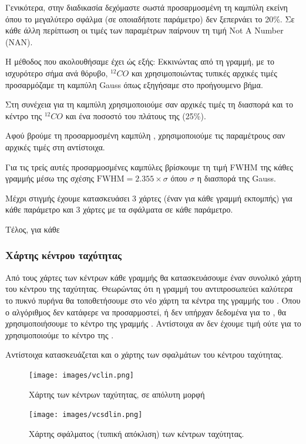 \documentclass[a4paper,12pt]{memoir}
\begin{document}
Γενικότερα, στην διαδικασία δεχόμαστε σωστά προσαρμοσμένη τη καμπύλη εκείνη όπου το μεγαλύτερο σφάλμα (σε οποιαδήποτε παράμετρο) δεν ξεπερνάει το 20\%. Σε κάθε άλλη περίπτωση οι τιμές των παραμέτρων παίρνουν τη τιμή Not A Number (NAN).

Η μέθοδος που ακολουθήσαμε έχει ώς εξής: Εκκινώντας από τη γραμμή, με το ισχυρότερο σήμα ανά θόρυβο, $^{12}CO$ και χρησιμοποιώντας τυπικές αρχικές τιμές προσαρμόζαμε τη καμπύλη Gauss όπως εξηγήσαμε στο προήγουμενο βήμα. 

Στη συνέχεια για τη καμπύλη  χρησιμοποιούμε σαν αρχικές τιμές τη διασπορά και το κέντρο της $^{12}CO$ και ένα ποσοστό του πλάτους της (25\%).

Αφού βρούμε τη προσαρμοσμένη καμπύλη , χρησιμοποιούμε τις παραμέτρους σαν αρχικές τιμές στη  αντίστοιχα.

Για τις τρείς αυτές προσαρμοσμένες καμπύλες βρίσκουμε τη τιμή FWHM της κάθες γραμμής μέσω της σχέσης $\text{FWHM}=2.355 \times \sigma$ όπου $\sigma$ η διασπορά της Gauss.

Μέχρι στιγμής έχουμε κατασκευάσει 3 χάρτες (έναν για κάθε γραμμή εκπομπής) για κάθε παράμετρο και 3 χάρτες με τα σφάλματα σε κάθε παράμετρο.

Τέλος, για κάθε 

\subsubsection{Χάρτης κέντρου ταχύτητας}
Από τους χάρτες των κέντρων κάθε γραμμής θα κατασκευάσουμε έναν συνολικό χάρτη του κέντρου της ταχύτητας. Θεωρώντας ότι η γραμμή του  αντιπροσωπεύει καλύτερα το πυκνό πυρήνα θα τοποθετήσουμε στο νέο χάρτη τα κέντρα της γραμμής του . Όπου ο αλγόριθμος δεν κατάφερε να προσαρμοστεί, ή δεν υπήρχαν δεδομένα για το , θα χρησιμοποιήσουμε το κέντρο της γραμμής . Αντίστοιχα αν δεν έχουμε τιμή ούτε για το  χρησιμοποιούμε το κέντρο της .

Αντίστοιχα κατασκευάζεται και ο χάρτης των σφαλμάτων του κέντρου ταχύτητας.

\begin{figure}[h!]
	\centering
	\texttt{[image: images/vclin.png]}
	\caption{Χάρτης των κέντρων ταχύτητας, σε απόλυτη μορφή}
	
		\centering
		\texttt{[image: images/vcsdlin.png]}
		\caption{Χάρτης σφάλματος (τυπική απόκλιση) των κέντρων ταχύτητας.}
\end{figure}
\end{document}
